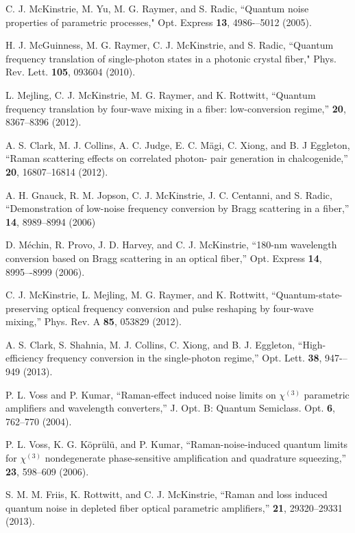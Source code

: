 \documentclass[10pt,letterpaper]{article}
\begin{document}
\begin{thebibliography}{99}
 C. J. McKinstrie, M. Yu, M. G. Raymer, and S. Radic, ``Quantum noise properties of parametric processes," Opt. Express \textbf{13}, 4986-–5012 (2005).

 H. J. McGuinness, M. G. Raymer, C. J. McKinstrie, and S. Radic, ``Quantum frequency translation of single-photon states in a photonic crystal fiber," Phys. Rev. Lett. \textbf{105}, 093604 (2010).

 L. Mejling, C. J. McKinstrie, M. G. Raymer, and K. Rottwitt, ``Quantum frequency translation by four-wave mixing in a fiber: low-conversion regime,'' \opex \textbf{20}, 8367--8396 (2012).

 A. S. Clark, M. J. Collins, A. C. Judge, E. C. M\"{a}gi, C. Xiong, and B. J Eggleton, ``Raman scattering effects on correlated photon- pair generation in chalcogenide,'' \opex \textbf{20}, 16807--16814 (2012).

 A. H. Gnauck, R. M. Jopson, C. J. McKinstrie, J. C. Centanni, and S. Radic, ``Demonstration of low-noise frequency conversion by Bragg scattering in a fiber,'' \opex \textbf{14}, 8989--8994 (2006)

 D. M\'{e}chin, R. Provo, J. D. Harvey, and C. J. McKinstrie, ``180-nm wavelength conversion based on Bragg scattering in an optical fiber,'' Opt. Express \textbf{14}, 8995–-8999 (2006).

 C. J. McKinstrie, L. Mejling, M. G. Raymer, and K. Rottwitt, ``Quantum-state-preserving optical frequency conversion and pulse reshaping by four-wave mixing,'' Phys. Rev. A \textbf{85}, 053829 (2012).

 A. S. Clark, S. Shahnia, M. J. Collins, C. Xiong, and B. J. Eggleton, ``High-efficiency frequency conversion in the single-photon regime,” Opt. Lett. \textbf{38}, 947-–949 (2013).

 P. L. Voss and P. Kumar, ``Raman-effect induced noise limits on $\chi^{(3)}$ parametric amplifiers and wavelength converters,'' J. Opt. B: Quantum Semiclass. Opt. \textbf{6}, 762--770 (2004).

 P. L. Voss, K. G. K\"{o}pr\"{u}l\"{u}, and P. Kumar, ``Raman-noise-induced quantum limits for $\chi^{(3)}$ nondegenerate phase-sensitive amplification and quadrature squeezing,'' \josab \textbf{23}, 598--609 (2006).

 S. M. M. Friis, K. Rottwitt, and C. J. McKinstrie, ``Raman and loss induced quantum noise in depleted fiber optical parametric amplifiers,'' \opex \textbf{21}, 29320--29331 (2013).


\end{thebibliography}
\end{document}
